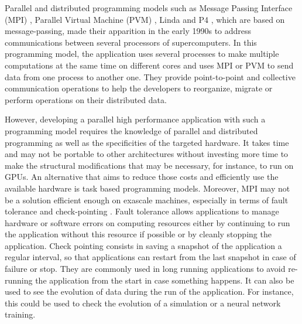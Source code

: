 Parallel and distributed programming models such as Message Passing Interface (MPI) \cite{MPIForum}, Parallel Virtual Machine (PVM) \cite{GBDJM1995}, Linda \cite{GeleC1992} \cite{CaGMS1994} and P4 \cite{ButRL1992}, which are based on message-passing, made their apparition in the early 1990s to address communications between several processors of supercomputers.
In this programming model, the application uses several processes to make multiple computations at the same time on different cores and uses MPI or PVM to send data from one process to another one.
They provide point-to-point and collective communication operations to help the developers to reorganize, migrate or perform operations on their distributed data.

However, developing a parallel high performance application with such a programming model requires the knowledge of parallel and distributed programming as well as the specificities of the targeted hardware.
It takes time and may not be portable to other architectures without investing more time to make the structural modifications that may be necessary, for instance, to run on GPUs.
An alternative that aims to reduce those costs and efficiently use the available hardware is task based programming models.
Moreover, MPI may not be a solution efficient enough on exascale machines, especially in terms of fault tolerance and check-pointing \cite{SWAAB2014}.
Fault tolerance allows applications to manage hardware or software errors on computing resources either by continuing to run the application without this resource if possible or by cleanly stopping the application.
Check pointing consists in saving a snapshot of the application a regular interval, so that applications can restart from the last snapshot in case of failure or stop.
They are commonly used in long running applications to avoid re-running the application from the start in case something happens.
It can also be used to see the evolution of data during the run of the application.
For instance, this could be used to check the evolution of a simulation or a neural network training.

